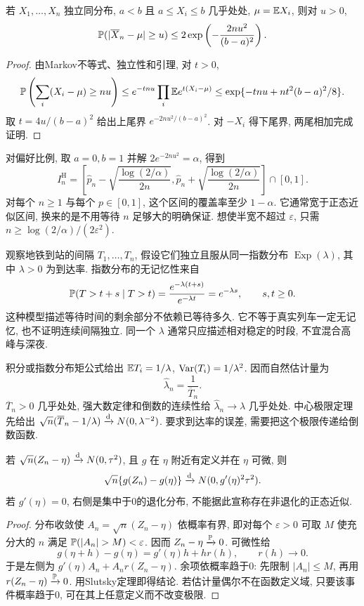 \begin{theorem}[Hoeffding不等式]
若 $X_1,\ldots,X_n$ 独立同分布, $a<b$ 且 $a\le X_i\le b$ 几乎处处, $\mu=\mathbb E X_i$, 则对 $u>0$,
\[
 \mathbb P(|\overline X_n-\mu|\ge u)\le2\exp\left(-\frac{2nu^2}{(b-a)^2}\right).
\]
\end{theorem}
\begin{proof}
由Markov不等式、独立性和引理, 对 $t>0$,
\[
 \mathbb P\left(\sum_i(X_i-\mu)\ge nu\right)
 \le e^{-tnu}\prod_i\mathbb E e^{t(X_i-\mu)}
 \le\exp\{-tnu+nt^2(b-a)^2/8\}.
\]
取 $t=4u/(b-a)^2$ 给出上尾界 $e^{-2nu^2/(b-a)^2}$. 对 $-X_i$ 得下尾界, 两尾相加完成证明.
\end{proof}
对偏好比例, 取 $a=0,b=1$ 并解 $2e^{-2nu^2}=\alpha$, 得到
\[
 I_n^{\mathrm H}=\left[\widehat p_n-\sqrt{\frac{\log(2/\alpha)}{2n}},
 \widehat p_n+\sqrt{\frac{\log(2/\alpha)}{2n}}\right]\cap[0,1].
\]
对每个 $n\ge1$ 与每个 $p\in[0,1]$, 这个区间的覆盖率至少 $1-\alpha$. 它通常宽于正态近似区间, 换来的是不用等待 $n$ 足够大的明确保证. 想使半宽不超过 $\varepsilon$, 只需 $n\ge\log(2/\alpha)/(2\varepsilon^2)$.

观察地铁到站的间隔 $T_1,\ldots,T_n$, 假设它们独立且服从同一指数分布 $\operatorname{Exp}(\lambda)$, 其中 $\lambda>0$ 为到达率. 指数分布的无记忆性来自
\[
 \mathbb P(T>t+s\mid T>t)=\frac{e^{-\lambda(t+s)}}{e^{-\lambda t}}=e^{-\lambda s},\qquad s,t\ge0.
\]
这种模型描述等待时间的剩余部分不依赖已等待多久. 它不等于真实列车一定无记忆, 也不证明连续间隔独立. 同一个 $\lambda$ 通常只应描述相对稳定的时段, 不宜混合高峰与深夜.

积分或指数分布矩公式给出 $\mathbb E T_i=1/\lambda$, $\operatorname{Var}(T_i)=1/\lambda^2$. 因而自然估计量为
\[
 \widehat\lambda_n=\frac1{\overline T_n}.
\]
$\overline T_n>0$ 几乎处处, 强大数定律和倒数的连续性给 $\widehat\lambda_n\to\lambda$ 几乎处处. 中心极限定理先给出 $\sqrt n(\overline T_n-1/\lambda)\xrightarrow{\mathrm d} N(0,\lambda^{-2})$. 要求到达率的误差, 需要把这个极限传递给倒数函数.

\begin{theorem}[一元Delta方法]
若 $\sqrt n(Z_n-\eta)\xrightarrow{\mathrm d} N(0,\tau^2)$, 且 $g$ 在 $\eta$ 附近有定义并在 $\eta$ 可微, 则
\[
 \sqrt n\{g(Z_n)-g(\eta)\}\xrightarrow{\mathrm d} N(0,g'(\eta)^2\tau^2).
\]
若 $g'(\eta)=0$, 右侧是集中于0的退化分布, 不能据此宣称存在非退化的正态近似.
\end{theorem}
\begin{proof}
分布收敛使 $A_n=\sqrt n(Z_n-\eta)$ 依概率有界, 即对每个 $\varepsilon>0$ 可取 $M$ 使充分大的 $n$ 满足 $\PP(|A_n|>M)<\varepsilon$. 因而 $Z_n-\eta\xrightarrow{\mathbb P}0$. 可微性给
\[
 g(\eta+h)-g(\eta)=g'(\eta)h+h r(h),\qquad r(h)\to0.
\]
于是左侧为 $g'(\eta)A_n+A_n r(Z_n-\eta)$. 余项依概率趋于0: 先限制 $|A_n|\le M$, 再用 $r(Z_n-\eta)\xrightarrow{\mathbb P}0$. 用Slutsky定理即得结论. 若估计量偶尔不在函数定义域, 只要该事件概率趋于0, 可在其上任意定义而不改变极限.
\end{proof}

